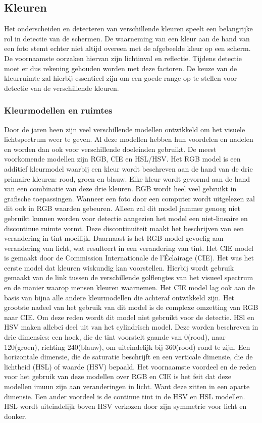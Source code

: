 
\subsection{Kleuren} \label{Kleuren}
Het onderscheiden en detecteren van verschillende kleuren speelt een belangrijke rol in detectie van de schermen. De waarneming van een kleur aan de hand van een foto stemt echter niet altijd overeen met de afgebeelde kleur op een scherm. De voornaamste oorzaken hiervan zijn lichtinval en reflectie. Tijdens detectie moet er dus rekening gehouden worden met deze factoren. De keuze van de kleurruimte zal hierbij essentieel zijn om een goede range op te stellen voor detectie van de verschillende kleuren.

\subsubsection{Kleurmodellen en ruimtes}
Door de jaren heen zijn veel verschillende modellen ontwikkeld om het visuele lichtspectrum weer te geven. Al deze modellen hebben hun voordelen en nadelen en worden dan ook voor verschillende doeleinden gebruikt. De meest voorkomende modellen zijn RGB, CIE en HSL/HSV. Het RGB model is een additief kleurmodel waarbij een kleur wordt beschreven aan de hand van de drie primaire kleuren: rood, groen en blauw. Elke kleur wordt gevormd aan de hand van een combinatie van deze drie kleuren. RGB wordt heel veel gebruikt in grafische toepassingen. Wanneer een foto door een computer wordt uitgelezen zal dit ook in RGB waarden gebeuren. Alleen zal dit model jammer genoeg niet gebruikt kunnen worden voor detectie aangezien het model een niet-lineaire en discontinue ruimte vormt. Deze discontinuiteit maakt het beschrijven van een verandering in tint moeilijk. Daarnaast is het RGB model gevoelig aan verandering van licht, wat resulteert in een verandering van tint. Het CIE model is gemaakt door de Commission Internationale de l'Éclairage (CIE). Het was het eerste model dat kleuren wiskundig kan voorstellen. Hierbij wordt gebruik gemaakt van de link tussen de verschillende golflengtes van het visueel spectrum en de manier waarop mensen kleuren waarnemen. Het CIE model lag ook aan de basis van bijna alle andere kleurmodellen die achteraf ontwikkeld zijn. Het grootste nadeel van het gebruik van dit model is de complexe omzetting van RGB naar CIE. Om deze reden wordt dit model niet gebruikt voor de detectie.  HSl en HSV maken allebei deel uit van het cylindrisch model. Deze worden beschreven in drie dimensies: een hoek, die de tint voorstelt gaande van 0\degree (rood), naar 120\degree (groen), richting 240\degree (blauw), om uiteindelijk bij 360\degree (rood) rond te zijn. Een horizontale dimensie, die de saturatie beschrijft en een verticale dimensie, die de lichtheid (HSL) of waarde (HSV) bepaald. Het voornaamste voordeel en de reden voor het gebruik van deze modellen over RGB en CIE is het feit dat deze modellen imuun zijn aan veranderingen in licht. Want deze zitten in een aparte dimensie. Een ander voordeel is de continue tint in de HSV en HSL modellen. HSL wordt uiteindelijk boven HSV verkozen door zijn symmetrie voor licht en donker. \cite{inbook} \cite{rasouli2017effect}


